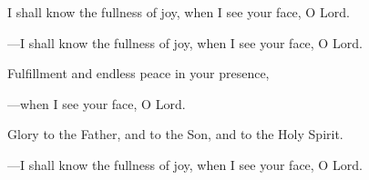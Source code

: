 \responsory
\begin{hangpar}

I shall know the fullness of joy, when I see your face, O Lord.

{\color{red}---\thinspace}I shall know the fullness of joy, when I see your face, O Lord.

\medskip Fulfillment and endless peace in your presence,

{\color{red}---\thinspace}when I see your face, O Lord.

\medskip Glory to the Father, and to the Son, and to the Holy Spirit.

{\color{red}---\thinspace}I shall know the fullness of joy, when I see your face, O Lord.
\end{hangpar}
